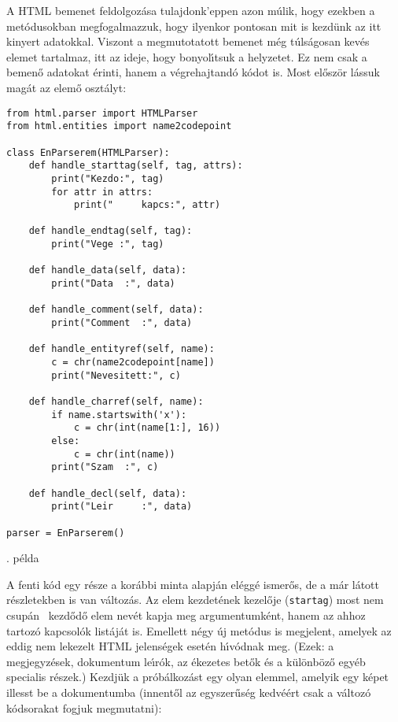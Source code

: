 \noindent A HTML bemenet feldolgoz\'asa tulajdonk'eppen azon m\'ulik, hogy ezekben a 
met\'odusokban megfogalmazzuk, hogy ilyenkor pontosan mit is kezd\"unk az itt kinyert 
adatokkal. Viszont a megmutotatott bemenet m\'eg t\'uls\'agosan kev\'es elemet tartalmaz, 
itt az ideje, hogy bonyol\'{\i}tsuk a helyzetet. Ez nem csak a bemen\H{o} adatokat \'erinti, 
hanem a v\'egrehajtand\'o k\'odot is. Most el\H{o}sz\"or l\'assuk mag\'at az elem\H{o} oszt\'alyt:

\incminta
\begin{Verbatim}[fontsize=\small]
from html.parser import HTMLParser
from html.entities import name2codepoint

class EnParserem(HTMLParser):
    def handle_starttag(self, tag, attrs):
        print("Kezdo:", tag)
        for attr in attrs:
            print("     kapcs:", attr)

    def handle_endtag(self, tag):
        print("Vege :", tag)

    def handle_data(self, data):
        print("Data  :", data)

    def handle_comment(self, data):
        print("Comment  :", data)

    def handle_entityref(self, name):
        c = chr(name2codepoint[name])
        print("Nevesitett:", c)

    def handle_charref(self, name):
        if name.startswith('x'):
            c = chr(int(name[1:], 16))
        else:
            c = chr(int(name))
        print("Szam  :", c)

    def handle_decl(self, data):
        print("Leir     :", data)

parser = EnParserem()
\end{Verbatim}
\theminta. p\'elda

 A fenti k\'od egy r\'esze a kor\'abbi minta alapj\'an el\'egg\'e 
ismer\H{o}s, de a m\'ar l\'atott r\'eszletekben is van v\'altoz\'as. Az elem kezdet\'enek kezel\H{o}je 
({\tt startag}) most nem csup\'an \ kezd\H{o}d\H{o} elem nev\'et kapja meg argumentumk\'ent, hanem az 
ahhoz tartoz\'o kapcsol\'ok list\'aj\'at is. Emellett n\'egy \'uj met\'odus is megjelent, amelyek az 
eddig nem lekezelt HTML jelens\'egek eset\'en h\'{\i}v\'odnak meg. (Ezek: a megjegyz\'esek, dokumentum 
le\'{\i}r\'ok, az \'ekezetes bet\H{o}k \'es a k\"ul\"onb\"oz\H{o} egy\'eb specialis r\'eszek.) Kezdj\"uk 
a pr\'ob\'alkoz\'ast egy olyan elemmel, amelyik egy k\'epet illesst be a dokumentumba (innent\H{o}l az 
egyszer\H{u}s\'eg kedv\'e\'ert csak a v\'altoz\'o k\'odsorakat fogjuk megmutatni):

